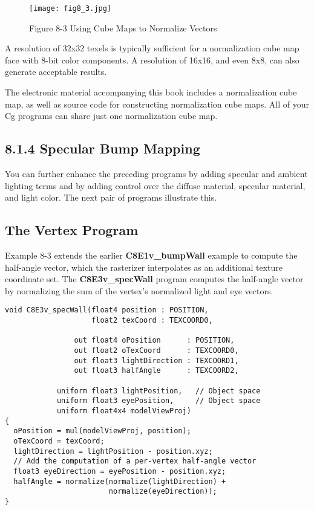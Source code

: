 \documentclass[../main.tex]{subfiles}
\begin{document}
\begin{figure}
    \centering
    \texttt{[image: fig8\_3.jpg]}
    \caption{Figure 8-3 Using Cube Maps to Normalize Vectors}
    \label{fig:8-3}
\end{figure}

A resolution of 32x32 texels is typically sufficient for a normalization cube map face with 8-bit color components. A resolution of 16x16, and even 8x8, can also generate acceptable results.

The electronic material accompanying this book includes a normalization cube map, as well as source code for constructing normalization cube maps. All of your Cg programs can share just one normalization cube map.

\subsection{8.1.4 Specular Bump Mapping}

You can further enhance the preceding programs by adding specular and ambient lighting terms and by adding control over the diffuse material, specular material, and light color. The next pair of programs illustrate this.

\subsection*{The Vertex Program}

Example 8-3 extends the earlier \textbf{C8E1v_bumpWall} example to compute the half-angle vector, which the rasterizer interpolates as an additional texture coordinate set. The \textbf{C8E3v_specWall} program computes the half-angle vector by normalizing the sum of the vertex's normalized light and eye vectors.

\FloatBarrier
\begin{lstlisting}[caption=Example 8-3. The C8E3v_specWall Vertex Program]
void C8E3v_specWall(float4 position : POSITION,
                    float2 texCoord : TEXCOORD0,

                out float4 oPosition      : POSITION,
                out float2 oTexCoord      : TEXCOORD0,
                out float3 lightDirection : TEXCOORD1,
                out float3 halfAngle      : TEXCOORD2,

            uniform float3 lightPosition,   // Object space
            uniform float3 eyePosition,     // Object space
            uniform float4x4 modelViewProj)
{
  oPosition = mul(modelViewProj, position);
  oTexCoord = texCoord;
  lightDirection = lightPosition - position.xyz;
  // Add the computation of a per-vertex half-angle vector
  float3 eyeDirection = eyePosition - position.xyz;
  halfAngle = normalize(normalize(lightDirection) +
                        normalize(eyeDirection));
}
\end{lstlisting}
\FloatBarrier
\end{document}
